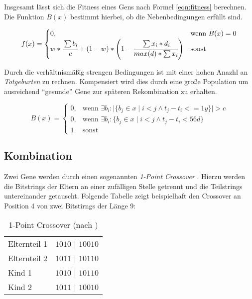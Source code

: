 Insgesamt lässt sich die Fitness eines Gens nach Formel \ref{eqn:fitness} berechnen.
Die Funktion $B(x)$ bestimmt hierbei, ob die Nebenbedingungen erfüllt sind.

\begin{equation}
    \label{eqn:fitness}
    f(x)=
    \begin{cases}
        0,              & \text{wenn } B(x) = 0 \\
        w * \cfrac{\sum b_i}{c} + (1 - w) * \left(1 - \cfrac{\sum x_i * d_i}{max(d) * \sum x_i}\right) & \text{sonst}
    \end{cases}
\end{equation}

Durch die verhältnismäßig strengen Bedingungen ist mit einer hohen Anazhl an \emph{Totgeburten} zu rechnen.
Kompensiert wird dies durch eine große Population um ausreichend \enquote{gesunde} Gene zur späteren Rekombination zu erhalten.

\begin{equation}
    \label{eqn:bedingung}
    B(x)=
    \begin{cases}
        0, & \text{wenn } \exists b_i : \lvert \{ b_j\in x \mid i < j \wedge t_j - t_i <= 1y  \} \rvert > c   \\
        0, & \text{wenn } \exists b_i : \{ b_j\in x \mid i < j \wedge t_j - t_i < 56d \}   \\
        1  & \text{sonst}
    \end{cases}
\end{equation}

\subsection{Kombination}\label{sec:evol-alg-kombi}
Zwei Gene werden durch einen sogenannten \emph{1-Point Crossover} \cite{AJ2015}.
Hierzu werden die Bitstrings der Eltern an einer zufälligen Stelle getrennt und die Teilstrings untereinander getauscht.
Folgende Tabelle zeigt beispielhaft den Crossover an Position 4 von zwei Bitstirngs der Länge 9:

\begin{table}[ht]
    \begin{center}
        \begin{tabular}{l c}
            Elternteil 1 & \colorbox{lime!30}{$1010$} $\mid$ \colorbox{lime!30}{$10010$} \\
            Elternteil 2 & \colorbox{cyan!30}{$1011$} $\mid$ \colorbox{cyan!30}{$10110$} \\
            \hline
            Kind 1       & \colorbox{lime!30}{$1010$} $\mid$ \colorbox{cyan!30}{$10110$} \\
            Kind 2       & \colorbox{cyan!30}{$1011$} $\mid$ \colorbox{lime!30}{$10010$} \\
        \end{tabular}
    \end{center}
    \caption{1-Point Crossover (nach \cite{AJ2015})}
\end{table}

